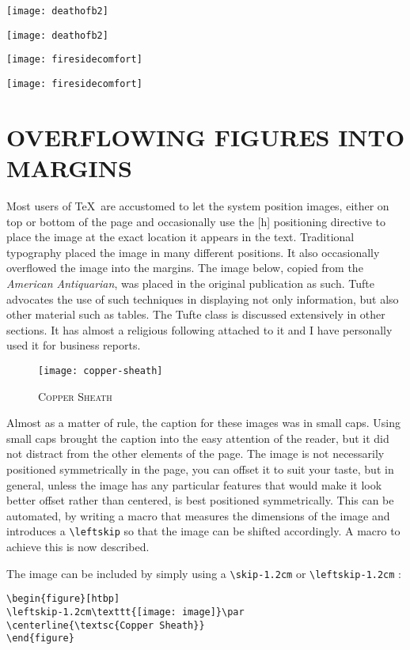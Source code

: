 \newpage
{}

\minipage{\textwidth}
\texttt{[image: deathofb2]}
\endminipage

\hspace*{-1.07\textwidth}\minipage{\textwidth}\texttt{[image: deathofb2]}
\endminipage

\minipage{\textwidth}
\texttt{[image: firesidecomfort]}
\endminipage

\hspace*{-1.12\textwidth}\minipage[t]{\textwidth}\texttt{[image: firesidecomfort]}
\endminipage

\vspace{-10cm}
\hspace*{11cm}\begin{minipage}[t]{4.5cm}
\lorem
\end{minipage}

\chapter{OVERFLOWING FIGURES INTO MARGINS}

Most users of \TeX\ are accustomed to let the system position images, either on top or bottom of the page and occasionally use the [h] positioning directive to place the image at the exact location it appears in the text. Traditional typography placed the image in many different positions. It also occasionally overflowed the image into the margins. The image below, copied from the \textit{American Antiquarian}, was placed in the original publication as such. Tufte advocates the use of such techniques in displaying not only information, but also other material such as tables. The Tufte class is discussed extensively in other sections. It has almost a religious following attached to it and I have personally used it for business reports.

\begin{figure}[htbp]
\leftskip-1.2cm\texttt{[image: copper-sheath]}\par
\centerline{\textsc{Copper Sheath}}
\end{figure}

Almost as a matter of rule, the caption for these images was in small caps. Using small caps brought the caption into the easy attention of the reader, but it did not distract from the other elements of the page.
The image is not necessarily positioned symmetrically in the page, you can offset it to suit your taste, but in general, unless the image has any particular features that would make it look better offset rather than centered, is best positioned symmetrically. This can be automated, by writing a macro that measures the dimensions of the image and introduces a \verb+\leftskip+ so that the image can be shifted accordingly. A macro to achieve this is now described.


The image can be included by simply using a \verb+\skip-1.2cm+ or \verb+\leftskip-1.2cm+ :

\begin{verbatim}
\begin{figure}[htbp]
\leftskip-1.2cm\texttt{[image: image]}\par
\centerline{\textsc{Copper Sheath}}
\end{figure}
\end{verbatim}

